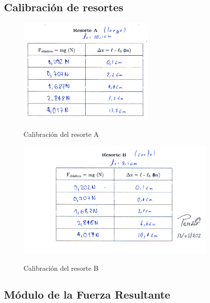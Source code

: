 \documentclass[10pt]{article}
\begin{document}
\subsection{Calibración de resortes}
\vspace{0,4cm}

\begin{figure}[H]
    \begin{center}
        \caption{Calibración del resorte A}  {\label{fig:A}} 
        \includegraphics[width = 0.6\textwidth]{Imagenes/ResorteA.png}
    \end{center}
\end{figure}

\begin{figure}[H]
    \begin{center}
        \caption{Calibración del resorte B}  {\label{fig:B}} 
        \includegraphics[width = 0.88\textwidth]{Imagenes/ResorteB.png}
    \end{center}
\end{figure}
\vspace{-0,8cm}
\subsection{Módulo de la Fuerza Resultante}
\end{document}
